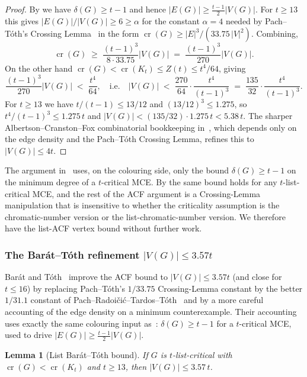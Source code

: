 \documentclass[11pt,a4paper]{article}
\newtheorem{lemma}[theorem]{Lemma}
\theoremstyle{definition}
\DeclareMathOperator{\crN}{cr}
\begin{document}
\begin{proof}
By  we have $\delta(G) \ge t - 1$ and hence
$|E(G)| \ge \tfrac{t-1}{2}|V(G)|$. For $t \ge 13$ this gives
$|E(G)| / |V(G)| \ge 6 \ge \alpha$ for the constant $\alpha = 4$
needed by Pach--T\'oth's Crossing Lemma~\cite{PachToth97} in the
form $\crN(G) \ge |E|^3 / (33.75\,|V|^2)$. Combining,
\[
   \crN(G) \;\ge\; \frac{(t-1)^3}{8 \cdot 33.75} |V(G)|
            \;=\; \frac{(t-1)^3}{270} |V(G)|.
\]
On the other hand $\crN(G) < \crN(K_t) \le Z(t) \le t^4 / 64$,
giving
\[
   \frac{(t-1)^3}{270} |V(G)| \;<\; \frac{t^4}{64},
   \quad \text{i.e.}\quad
   |V(G)| \;<\; \frac{270}{64} \cdot \frac{t^4}{(t-1)^3}
   \;=\; \frac{135}{32} \cdot \frac{t^4}{(t-1)^3}.
\]
For $t \ge 13$ we have $t/(t-1) \le 13/12$ and $(13/12)^3 \le
1.275$, so $t^4/(t-1)^3 \le 1.275 \, t$ and
$|V(G)| < (135/32) \cdot 1.275 \, t < 5.38 \, t$. The sharper
Albertson--Cranston--Fox combinatorial bookkeeping
in~\cite[\S 2]{ACF}, which depends only on the edge density and
the Pach--T\'oth Crossing Lemma, refines this to
$|V(G)| \le 4t$.
\end{proof}

The argument in~\cite[\S 2]{ACF} uses, on the colouring side, only
the bound $\delta(G) \ge t - 1$ on the minimum degree of a
$t$-critical MCE. By  the same bound holds
for any $t$-list-critical MCE, and the rest of the ACF argument
is a Crossing-Lemma manipulation that is insensitive to whether
the criticality assumption is the chromatic-number version or the
list-chromatic-number version. We therefore have the list-ACF
vertex bound without further work.

\subsubsection*{The Bar\'at--T\'oth refinement $|V(G)| \le 3.57t$}

Bar\'at and T\'oth~\cite[Theorem~1.2]{BT} improve the ACF bound to
$|V(G)| \le 3.57t$ (and close  for
$t \le 16$) by replacing Pach--T\'oth's $1/33.75$ Crossing-Lemma
constant by the better $1/31.1$ constant of
Pach--Radoi\v{c}i\'c--Tardos--T\'oth~\cite{PRTT} and by a more
careful accounting of the edge density on a minimum counterexample.
Their accounting uses exactly the same colouring input as~\cite{ACF}:
$\delta(G) \ge t - 1$ for a $t$-critical MCE, used to drive
$|E(G)| \ge \tfrac{t-1}{2}|V(G)|$.

\begin{lemma}[List Bar\'at--T\'oth bound]\label{lem:list-bt}
If $G$ is $t$-list-critical with $\crN(G) < \crN(K_t)$ and
$t \ge 13$, then $|V(G)| \le 3.57\,t$.
\end{lemma}
\end{document}
